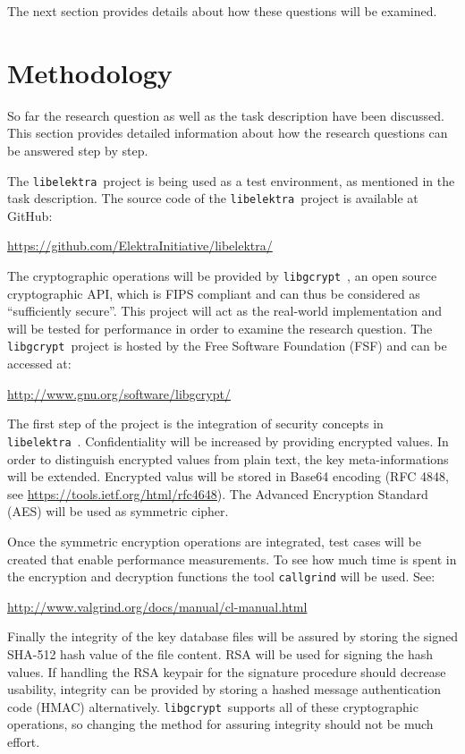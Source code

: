 \documentclass[a4paper,12pt]{article}
\newcommand{\libelektra}{\texttt{libelektra}~}
\newcommand{\libgcrypt}{\texttt{libgcrypt}~}
\begin{document}
The next section provides details about how these questions will be examined.


\section{Methodology}

So far the research question as well as the task description have been discussed.
This section provides detailed information about how the research questions can be answered step by step.

The \libelektra project is being used as a test environment, as mentioned in the task description.
The source code of the \libelektra project is available at GitHub:

\url{https://github.com/ElektraInitiative/libelektra/}

The cryptographic operations will be provided by \libgcrypt, an open source cryptographic API, which is FIPS compliant and can thus be considered as ``sufficiently secure''.
This project will act as the real-world implementation and will be tested for performance in order to examine the research question.
The \libgcrypt project is hosted by the Free Software Foundation (FSF) and can be accessed at:

\url{http://www.gnu.org/software/libgcrypt/}

The first step of the project is the integration of security concepts in \libelektra. Confidentiality will be increased by providing encrypted values. In order to distinguish encrypted values from plain text, the key meta-informations will be extended. Encrypted valus will be stored in Base64 encoding (RFC 4848, see \url{https://tools.ietf.org/html/rfc4648}). The Advanced Encryption Standard (AES) will be used as symmetric cipher.

Once the symmetric encryption operations are integrated, test cases will be created that enable performance measurements. To see how much time is spent in the encryption and decryption functions the tool \texttt{callgrind} will be used. See:

\url{http://www.valgrind.org/docs/manual/cl-manual.html}

Finally the integrity of the key database files will be assured by storing the signed SHA-512 hash value of the file content. RSA will be used for signing the hash values. If handling the RSA keypair for the signature procedure should decrease usability, integrity can be provided by storing a hashed message authentication code (HMAC) alternatively. \libgcrypt supports all of these cryptographic operations, so changing the method for assuring integrity should not be much effort.
\end{document}
